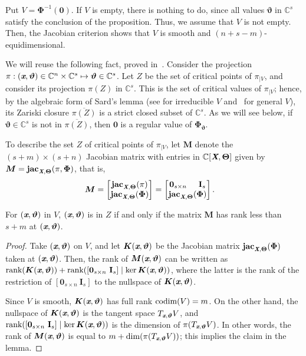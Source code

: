 \documentclass[sigconf]{acmart}
\def\Xb{\textit{\textbf{X}}}
\def\Thetab{\bm{\Theta}}
\def\thetab{\bm{\vartheta}}
\def\xb{\textit{\textbf{x}}}
\def\C{\mathbb{C}}
\def\jac{ \textbf{jac}}
\def\dt{s}
\def\bbm{\begin{bmatrix}}
\def\ebm{\end{bmatrix}}
\begin{document}
Put $V = \bm\Phi^{-1}(\bm 0)$. If $V$ is empty, there is nothing to do,
since all values $\thetab$ in $\C^\dt$ satisfy the conclusion of the
proposition. Thus, we assume that $V$ is not empty. Then, the Jacobian
criterion shows that $V$ is smooth and $(n+ \dt -m)$-equidimensional.

We will reuse the following fact, proved in~\cite{TWT}.  Consider the
projection $\pi:(\xb, \thetab) \in \C^n \times \C^{\dt} \mapsto
\thetab \in\C^{\dt}$.  Let $Z$ be the set of critical points of
$\pi_{|V}$, and consider its projection $\pi(Z)$ in $\C^s$. This is
the set of critical values of $\pi_{|V}$; hence, by the algebraic form
of Sard's lemma (see \cite[Theorem~3.7]{Mumford76} for irreducible $V$
and~\cite[Proposition~B.2]{TWT} for general $V$), its Zariski closure
$\overline{\pi(Z)}$ is a strict closed subset of $\C^s$. As we will
see below, if $\thetab \in \C^{\dt}$ is not in $\overline{\pi(Z)}$,
then $\bm 0$ is a regular value of $\bm\Phi_{\thetab}$.

To describe the set $Z$ of critical points of $\pi_{|V}$, let $\bm M$
denote the $(s+m) \times (s+n)$ Jacobian matrix with entries in
$\C[\Xb,\Thetab]$ given by $\bm M = \jac_{\Xb,\Thetab}(\pi,\bm\Phi)$,
that is,
\begin{align*}
\bm M &= 
\bbm 
\jac_{\Xb,\Thetab}(\pi)\\
\jac_{\Xb,\Thetab}(\bm\Phi) 
\ebm 
=
\bbm 
\textbf{0}_{\dt \times n}\hspace{5mm}\textbf{I}_{\dt} \\
\jac_{\Xb,\Thetab}(\bm\Phi)
\ebm.
\end{align*}

\begin{lemma} 
  For $(\xb,\thetab)$ in $V$, $(\xb,\thetab)$ is in $Z$ if and only if
  the matrix $\bm M$ has rank less than $\dt+m$ at $(\xb,\thetab)$.
\end{lemma}
\begin{proof}
  Take $(\xb,\thetab)$ on $V$, and let $\bm K(\xb,\thetab)$ be the
  Jacobian matrix $\jac_{\Xb,\Thetab}(\bm\Phi)$ taken at $(\xb,\thetab)$.
  Then, the rank of $\bm M(\xb,\thetab)$ can be written as
  $\textup{rank}(\bm K(\xb,\thetab)) + \textup{rank}([\textbf{0}_{\dt
      \times n}~\textbf{I}_{\dt}] \mid \ker \bm K(\xb,\thetab))$, where
  the latter is the rank of the restriction of $[\textbf{0}_{\dt
      \times n}~\textbf{I}_{\dt}]$ to the nullspace of
  $\bm K(\xb,\thetab)$.

  Since $V$ is smooth, $\bm K(\xb,\thetab)$ has full rank ${\rm codim}
  (V) = m$. On the other hand, the nullspace of $\bm K(\xb,\thetab)$
  is the tangent space $T_{\xb,\thetab} V$, and
  $\textup{rank}([\textbf{0}_{\dt \times n}~\textbf{I}_{\dt}] \mid
  \ker \bm K(\xb,\thetab))$ is the dimension of $\pi(T_{\xb,\thetab}
  V)$.  In other words, the rank of $\bm M(\xb,\thetab)$ is equal to
  $m+\dim(\pi(T_{\xb,\thetab} V))$; this implies the claim in the
  lemma.
\end{proof}
\end{document}
